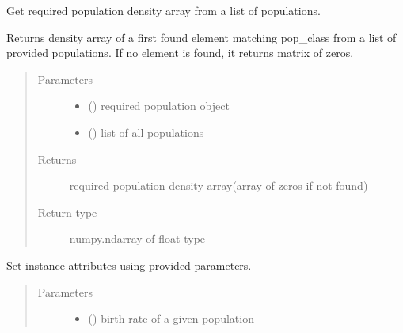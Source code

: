 \documentclass[letterpaper,10pt,english]{sphinxmanual}
\begin{document}
\begin{fulllineitems}
\begin{quote}
\begin{description}
\end{description}\end{quote}

\begin{fulllineitems}
\label{\detokenize{pumha:pumha.pop.Population.find_density_arr}}
Get required population density array from a list of populations.

Returns density array of a first found element matching pop\_class from
a list of provided populations. If no element is found, it returns
matrix of zeros.
\begin{quote}\begin{description}
\item[{Parameters}] \leavevmode\begin{itemize}
\item {} 
 () \textendash{} required population object

\item {} 
 () \textendash{} list of all populations

\end{itemize}

\item[{Returns}] \leavevmode
required population density array(array of zeros if not found)

\item[{Return type}] \leavevmode
numpy.ndarray of float type

\end{description}\end{quote}

\end{fulllineitems}


\begin{fulllineitems}
\label{\detokenize{pumha:pumha.pop.Population.load_config}}
Set instance attributes using provided parameters.
\begin{quote}\begin{description}
\item[{Parameters}] \leavevmode\begin{itemize}
\item {} 
 () \textendash{} birth rate of a given population


\end{itemize}
\end{description}
\end{quote}
\end{fulllineitems}
\end{fulllineitems}
\end{document}
